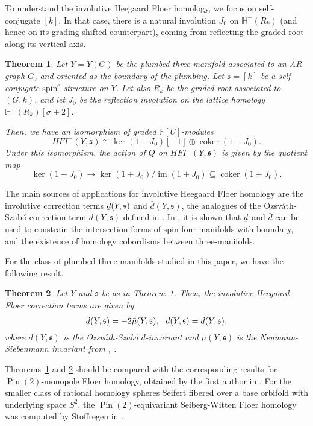 \documentclass[11 pt]{amsart}
\newtheorem {theorem}{Theorem}[section]
\theoremstyle{remark}
\DeclareMathOperator{\coker}{coker}
\DeclareMathOperator{\im}{im}
\def\spinc {{\operatorname{spin^c}}}
\def\s{\mathfrak s}
\def\ff {{\mathbb{F}}}
\def\ker {{\operatorname{ker}}}
\def\pin{\operatorname{Pin}(2)}
\newcommand{\bunderline}[1]{\underline{#1\mkern-2mu}\mkern2mu }
\def\du {\bar{d}}
\def\dl {\bunderline{d}}
\def\He{\mathbb{H}}
\def\HFI {\mathit{HFI}}
\newcommand \HFIm {\HFI^-}
\begin{document}
To understand the involutive Heegaard Floer homology, we focus on self-conjugate $[k]$. In that case, there is a natural involution $J_0$ on $\He^-(R_k)$ (and hence on its grading-shifted counterpart), coming from reflecting the graded root along its vertical axis. 

\begin{theorem}
\label{thm:main}
Let $Y=Y(G)$ be the plumbed three-manifold associated to an AR graph $G$, and oriented as the boundary of the plumbing. Let $\s=[k]$ be a self-conjugate $\spinc$ structure on $Y$. Let also $R_k$ be the graded root associated to $(G, k)$, and let $J_0$ be the reflection involution on the lattice homology $\He^-(R_k)[\sigma + 2]$. 

Then, we have an isomorphism of graded $\ff[U]$-modules
\[
\HFIm(Y, \s) \cong \ker (1 + J_0)[-1] \oplus \coker (1 + J_0).
\]
Under this isomorphism, the action of $Q$ on $\HFIm(Y, \s)$ is given by the quotient map
\[
\ker (1 + J_0) \rightarrow \ker (1 + J_0)/\im (1 + J_0) \subseteq \coker (1 + J_0).
\]
\end{theorem}

The main sources of applications for involutive Heegaard Floer homology are the involutive correction terms $\dl(Y, \s)$ and $\du(Y, \s)$, the analogues of the Ozsv\'ath-Szab\'o correction term $d(Y,\s)$ defined in \cite{AbsGraded}. In \cite{HMinvolutive}, it is shown that $\dl$ and $\du$ can be used to constrain the intersection forms of spin four-manifolds with boundary, and the existence of homology cobordisms between three-manifolds. 

For the class of plumbed three-manifolds studied in this paper, we have the following result.
\begin{theorem}
\label{thm:ds}
Let $Y$ and $\s$ be as in Theorem~\ref{thm:main}. Then, the involutive Heegaard Floer correction terms are given by 
$$\dl(Y, \s) = - 2\bar{\mu}(Y, \s), \ \ \du(Y, \s) = d(Y, \s),$$ where $d(Y, \s)$ is the Ozsv\'ath-Szab\'o $d$-invariant and $\bar{\mu}(Y, \s)$ is the Neumann-Siebenmann invariant from \cite{Neu}, \cite{Sieb}.
\end{theorem}

Theorems~\ref{thm:main} and \ref{thm:ds} should be compared with the corresponding results for $\pin$-monopole Floer homology, obtained by the first author in \cite{Dai}. For the smaller class of  rational homology spheres Seifert fibered over a base orbifold with underlying space $S^2$, the $\pin$-equivariant Seiberg-Witten Floer homology was computed by Stoffregen in \cite{Stoffregen}.
\end{document}
